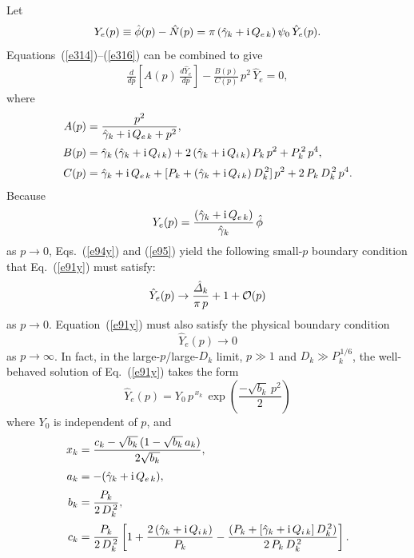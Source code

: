 \documentclass[12pt,prb,aps]{revtex4-1}
\begin{document}
Let 
\begin{align}\label{e95}
Y_e(p)\equiv \hat{\phi}(p)-\hat{N}(p)= \pi\,(\hat{\gamma}_k+{\rm i}\,Q_{e\,k})\,\psi_0\,\hat{Y}_e(p).
\end{align}
 Equations~(\ref{e314})--(\ref{e316}) can be combined to give\,\cite{cole,diff}
\begin{align}\label{e91y}
\frac{d}{dp}\!\left[A(p)\,\frac{d\hat{Y}_e}{dp}\right] - \frac{B(p)}{C(p)}\,p^2\,\hat{Y}_e=0,
\end{align}
where
\begin{align}
A(p) &= \frac{p^2}{\hat{\gamma}_k+{\rm i}\,Q_{e\,k}+p^2},\label{e97a}\\[0.5ex]
B(p)&=\hat{\gamma}_k\,(\hat{\gamma}_k+{\rm i}\,Q_{i\,k})+2\,(\hat{\gamma}_k+{\rm i}\,Q_{i\,k})\,P_k\,p^2 +P_k^{\,2}\,p^4,\\[0.5ex]
C(p) &=\hat{\gamma}_k+{\rm i}\,Q_{e\,k}+ [P_k+
(\hat{\gamma}_k+{\rm i}\,Q_{i\,k})\,D_k^{\,2}]\,p^2 + 2\,P_k\,D_k^{\,2}\,p^4.
\end{align}
Because
\begin{equation}
Y_e(p) =\frac{(\hat{\gamma}_k+{\rm i}\,Q_{e\,k})}{\hat{\gamma}_k}\,\hat{\phi}
\end{equation}
as $p\rightarrow 0$, Eqs.~(\ref{e94y}) and (\ref{e95})
yield the following small-$p$ boundary condition that Eq.~(\ref{e91y}) must satisfy:
\begin{equation}\label{e101}
\hat{Y}_e(p)\rightarrow\frac{\hat{\mit\Delta}_k}{\pi\,p} + 1+ {\cal O}(p)
\end{equation}
as $p\rightarrow 0$.  Equation~(\ref{e91y}) must also satisfy the  physical boundary condition 
\begin{equation}\label{e102}
\hat{Y}_e(p)\rightarrow 0
\end{equation}
as $p\rightarrow\infty$. 
In fact, in the large-$p$/large-$D_k$ limit, $p\gg 1$ and $D_k\gg P_k^{\,1/6}$, the well-behaved solution of Eq.~(\ref{e91y}) takes the form 
\begin{equation}\label{d33}
\hat{Y}_e(p) = Y_0\,p^{\,x_k}\,\exp\left(\frac{-\sqrt{b_k}\,p^2}{2}\right)
\end{equation}
where $Y_0$ is independent of $p$, and
\begin{align}
x_k&= \frac{c_k -\sqrt{b_k}\,(1-\sqrt{b_k}\,a_k)}{2\sqrt{b_k}},\\[0.5ex]
a_k &= -(\hat{\gamma}_k+ {\rm i}\,Q_{e\,k}),\\[0.5ex]
b_k&= \frac{P_k}{2\,D_k^{\,2}},\\[0.5ex]
c_k&= \frac{P_k}{2\,D_k^{\,2}}\left[1+\frac{2\, (\hat{\gamma}_k+{\rm i}\,Q_{i\,k})}{P_k}-\frac{(P_k+[\hat{\gamma}_k+{\rm i}\,Q_{i\,k}]\,D_k^{\,2})}{2\,P_k\,D_k^{\,2}}\right].
\end{align}
\end{document}

